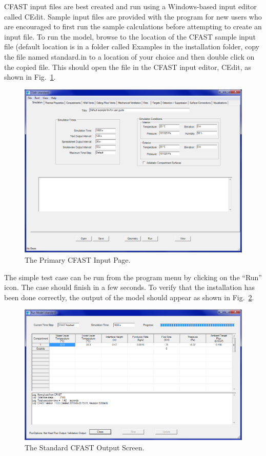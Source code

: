 CFAST input files are best created and run using a Windows-based input editor called CEdit. Sample input files are provided with the program for new users who are encouraged to first run the sample calculations before attempting to create an input file. To run the model, browse to the location of the CFAST sample input file (default location is in a folder called {\ct Examples} in the installation folder, copy the file named {\ct standard.in} to a location of your choice and then double click on the copied file. This should open the file in the CFAST input editor, CEdit, as shown in Fig.~\ref{primary_screen}.
\begin{figure}[h!]
\includegraphics[width=6.5in]{FIGURES/Running_CFAST/Environment_Tab}
\caption[The Primary CFAST Input Page]{The Primary CFAST Input Page.}
\label{primary_screen}
\end{figure}
The simple test case can be run from the program menu by clicking on the ``Run'' icon. The case should finish in a few seconds. To verify that the installation has been done correctly, the output of the model should appear as shown in Fig.~\ref{Run_Model}.
\begin{figure}[h!]
\includegraphics[width=6.5in]{FIGURES/Getting_Started/Standard_Output}
\caption[The Standard CFAST Output Screen]{The Standard CFAST Output Screen.}
\label{Run_Model}
\end{figure}


